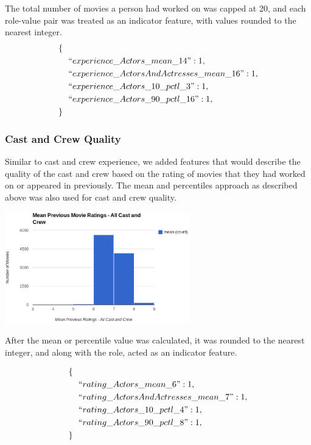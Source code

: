 \documentclass[journal]{IEEEtran}
\begin{document}
The total number of movies a person had worked on was capped at 20, and each role-value pair was treated as an indicator feature, with values rounded to the nearest integer.
\begin{align*}
        \{\ \ &\\
        &``experience\_Actors\_mean\_14": 1,\\
        &``experience\_ActorsAndActresses\_mean\_16": 1,\\
        &``experience\_Actors\_10\_pctl\_3": 1,\\
        &``experience\_Actors\_90\_pctl\_16": 1,\\
        \}\ \ &
\end{align*}

\subsubsection{Cast and Crew Quality}

Similar to cast and crew experience, we added features that would describe the quality of the cast and crew based on the rating of movies that they had worked on or appeared in previously.  The mean and percentiles approach as described above was also used for cast and crew quality.

\includegraphics[width=8cm]{charts/crew_quality.eps}

After the mean or percentile value was calculated, it was rounded to the nearest integer, and along with the role, acted as an indicator feature.

\begin{align*}
        \{\ \ &\\
        &``rating\_Actors\_mean\_6": 1,\\
        &``rating\_ActorsAndActresses\_mean\_7": 1,\\
        &``rating\_Actors\_10\_pctl\_4": 1,\\
        &``rating\_Actors\_90\_pctl\_8": 1,\\
        \}\ \ &
\end{align*}
\end{document}
